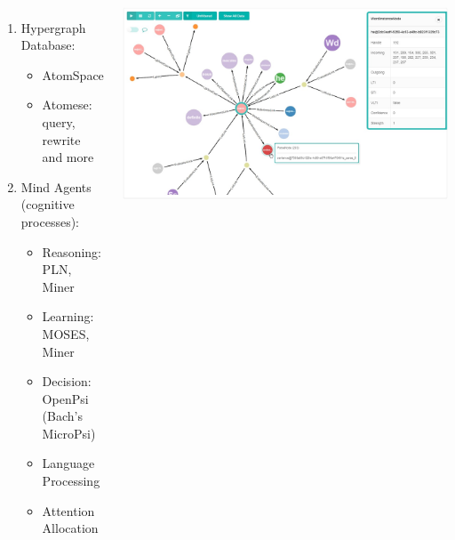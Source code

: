 \documentclass[aspectratio=169]{beamer}
\begin{document}
\begin{frame}





  \\[0.5cm]

  \begin{columns}
    \column{3in}
  
    \begin{enumerate}
    \item Hypergraph Database: 
      \begin{itemize}
      \item AtomSpace
      \item Atomese: query, rewrite and more
      \end{itemize}
    \item Mind Agents (cognitive processes):
      \begin{itemize}
      \item \alert{Reasoning: PLN, Miner}
      \item Learning: MOSES, Miner
      \item Decision: OpenPsi (Bach's MicroPsi)
      \item Language Processing
      \item Attention Allocation
      \end{itemize}
    \end{enumerate}

    \column{3in}

    \includegraphics[scale=0.2]{images/ng2-atomspace-visualizer.jpg}


\end{columns}
\end{frame}
\end{document}
